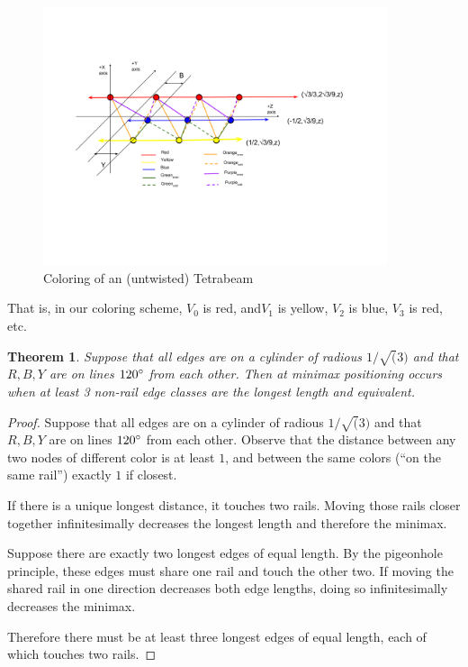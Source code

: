 \documentclass[11pt]{article}
\newtheorem{theorem}{Theorem}
\begin{document}
 \begin{figure}[H]
     \centering
     \includegraphics[width=0.9\textwidth]{figures/TetrahelixColoringDiagram.png}
     \caption{Coloring of an (untwisted) Tetrabeam}
 \end{figure}


  That is, in our coloring scheme, $V_0$ is red, and$ V_1$ is yellow,  $V_2$ is blue,
  $V_3$ is red, etc.

\begin{theorem}
  Suppose that all edges are on a cylinder of radious $1/\sqrt(3)$ and that $R,B,Y$ are on lines $120\degree$ from each other.
  Then at minimax positioning occurs when at least 3 non-rail edge classes are the longest length and equivalent.
 \end{theorem}
\begin{proof}
  Suppose that all edges are on a cylinder of radious $1/\sqrt(3)$ and that $R,B,Y$ are on lines $120\degree$ from each other. Observe
  that the distance between any two nodes of different color is at least $1$, and between the same colors (``on the same rail'') exactly $1$ if closest.

  If there is a unique longest distance, it touches two rails. Moving those rails closer together infinitesimally decreases the longest length and
  therefore the minimax.

  Suppose there are exactly two longest edges of equal length. By the pigeonhole principle, these edges must share one rail and touch the other two.
  If moving the shared rail in one direction decreases both edge lengths, doing so infinitesimally decreases the minimax.

  Therefore there must be at least three longest edges of equal length, each of which touches two rails.
  \end{proof}
\end{document}
